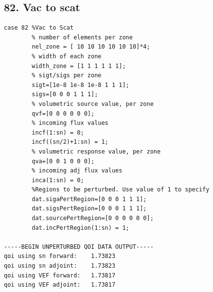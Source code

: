 \documentclass{article}
\begin{document}
\subsection{82. Vac to scat}
\begin{verbatim}
case 82 %Vac to Scat
        % number of elements per zone
        nel_zone = [ 10 10 10 10 10 10]*4;
        % width of each zone
        width_zone = [1 1 1 1 1 1];
        % sigt/sigs per zone
        sigt=[1e-8 1e-8 1e-8 1 1 1];
        sigs=[0 0 0 1 1 1];
        % volumetric source value, per zone
        qvf=[0 0 0 0 0 0];
        % incoming flux values
        incf(1:sn) = 0;
        incf((sn/2)+1:sn) = 1;
        % volumetric response value, per zone
        qva=[0 0 1 0 0 0];
        % incoming adj flux values
        inca(1:sn) = 0;
        %Regions to be perturbed. Use value of 1 to specify
        dat.sigaPertRegion=[0 0 0 1 1 1];
        dat.sigsPertRegion=[0 0 0 1 1 1];
        dat.sourcePertRegion=[0 0 0 0 0 0];
        dat.incPertRegion(1:sn) = 1;
        
-----BEGIN UNPERTURBED QOI DATA OUTPUT----- 
qoi using sn forward: 	 1.73823 
qoi using sn adjoint: 	 1.73823 
qoi using VEF forward: 	 1.73817 
qoi using VEF adjoint: 	 1.73817 
\end{verbatim}
\end{document}
